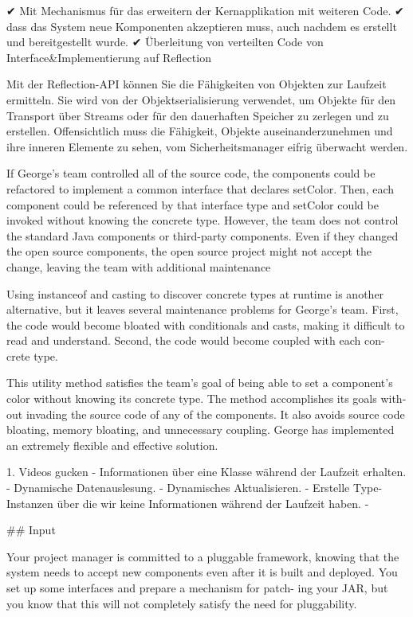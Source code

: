 
 ✔ Mit Mechanismus für das erweitern der Kernapplikation mit weiteren Code. 
 ✔ dass das System neue Komponenten akzeptieren muss, auch nachdem es erstellt und bereitgestellt wurde.
 ✔ Überleitung von verteilten Code von Interface&Implementierung auf Reflection


Mit der Reflection-API können Sie die Fähigkeiten von Objekten zur Laufzeit ermitteln. Sie wird von der Objektserialisierung verwendet, um Objekte für den Transport über Streams oder für den dauerhaften Speicher zu zerlegen und zu erstellen. Offensichtlich muss die Fähigkeit, Objekte auseinanderzunehmen und ihre inneren Elemente zu sehen, vom Sicherheitsmanager eifrig überwacht werden.


 If George’s team controlled all of the source code, the components could be refactored to implement a common interface that declares setColor. Then, each component could be referenced by that interface type and setColor could be invoked without knowing the concrete type. However, the team does not control the standard Java components or third-party components. Even if they changed the open source components, the open source project might not accept the change, leaving the team with additional maintenance

 Using instanceof and casting to discover concrete types at runtime is another alternative, but it leaves several maintenance problems for George’s team. First, the code would become bloated with conditionals and casts, making it difficult to read and understand. Second, the code would become coupled with each con- crete type. 

 This utility method satisfies the team’s goal of being able to set a component’s color without knowing its concrete type. The method accomplishes its goals with- out invading the source code of any of the components. It also avoids source code bloating, memory bloating, and unnecessary coupling. George has implemented an extremely flexible and effective solution.

 1. Videos gucken
  - Informationen über eine Klasse während der Laufzeit erhalten.
  - Dynamische Datenauslesung.
  - Dynamisches Aktualisieren.
  - Erstelle Type-Instanzen über die wir  keine Informationen während der Laufzeit haben.  
  -



## Input 

Your project manager is committed to a pluggable framework, knowing that the system needs to accept new components even after it is built and deployed. You set up some interfaces and prepare a mechanism for patch- ing your JAR, but you know that this will not completely satisfy the need for pluggability.

